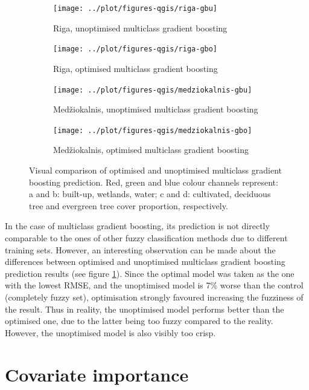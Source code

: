 \documentclass[a4paper,12pt]{scrbook}
\begin{document}
\begin{figure}
  \centering
  \begin{subfigure}[b]{0.48\textwidth}
    \centering
    \texttt{[image: ../plot/figures-qgis/riga-gbu]}
    \caption{Riga, unoptimised multiclass gradient boosting}
  \end{subfigure} \hfill
  \begin{subfigure}[b]{0.48\textwidth}
    \centering
    \texttt{[image: ../plot/figures-qgis/riga-gbo]}
    \caption{Riga, optimised multiclass gradient boosting}
  \end{subfigure}
  \begin{subfigure}[b]{0.48\textwidth}
    \centering
    \texttt{[image: ../plot/figures-qgis/medziokalnis-gbu]}
    \caption{Med\v{z}iokalnis, unoptimised multiclass gradient boosting}
  \end{subfigure} \hfill
  \begin{subfigure}[b]{0.48\textwidth}
    \centering
    \texttt{[image: ../plot/figures-qgis/medziokalnis-gbo]}
    \caption{Med\v{z}iokalnis, optimised multiclass gradient boosting}
  \end{subfigure}
  \caption{Visual comparison of optimised and unoptimised multiclass gradient boosting prediction. Red, green and blue colour channels represent: a and b: built-up, wetlands, water; c and d: cultivated, deciduous tree and evergreen tree cover proportion, respectively.}
  \label{fig-gradientboost-comparison}
\end{figure}

In the case of multiclass gradient boosting, its prediction is not directly comparable to the ones of other fuzzy classification methods due to different training sets. However, an interesting observation can be made about the differences between optimised and unoptimised multiclass gradient boosting prediction results (see figure \ref{fig-gradientboost-comparison}). Since the optimal model was taken as the one with the lowest RMSE, and the unoptimised model is 7\% worse than the control (completely fuzzy set), optimisation strongly favoured increasing the fuzziness of the result. Thus in reality, the unoptimised model performs better than the optimised one, due to the latter being too fuzzy compared to the reality. However, the unoptimised model is also visibly too crisp.

\section{Covariate importance}
\end{document}
